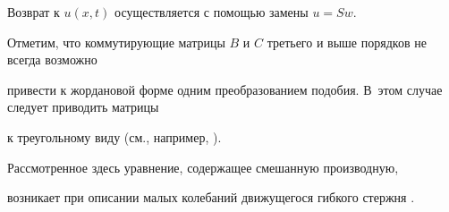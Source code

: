 Возврат к $u(x,t)$ осуществляется с помощью замены $u=Sw$.



\smallskip



Отметим, что коммутирующие матрицы $B$ и $C$ третьего и выше  порядков не всегда возможно

привести к жордановой форме одним преобразованием подобия. В~этом случае следует приводить матрицы

к треугольному виду (см., например, \cite{kozlova:bib:Markus}).



Рассмотренное здесь уравнение, содержащее смешанную производную,

возникает при описании малых колебаний движущегося гибкого стержня \cite{kozlova:bib:Svetlickii,kozlova:bib:Skorobogatko}.





